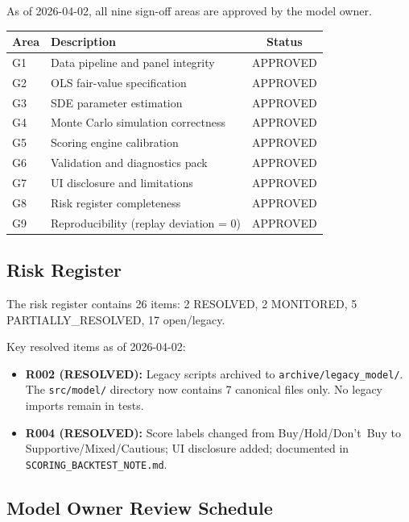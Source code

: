 \documentclass[11pt,a4paper]{article}
\theoremstyle{plain}
\theoremstyle{definition}
\begin{document}
As of 2026-04-02, all nine sign-off areas are approved by the model owner.

\begin{center}
\begin{tabular}{llc}
\toprule
Area & Description & Status \\
\midrule
G1 & Data pipeline and panel integrity      & APPROVED \\
G2 & OLS fair-value specification           & APPROVED \\
G3 & SDE parameter estimation               & APPROVED \\
G4 & Monte Carlo simulation correctness     & APPROVED \\
G5 & Scoring engine calibration             & APPROVED \\
G6 & Validation and diagnostics pack        & APPROVED \\
G7 & UI disclosure and limitations          & APPROVED \\
G8 & Risk register completeness             & APPROVED \\
G9 & Reproducibility (replay deviation = 0) & APPROVED \\
\bottomrule
\end{tabular}
\end{center}

\subsection{Risk Register}

The risk register contains 26 items:
2 RESOLVED, 2 MONITORED, 5 PARTIALLY\_RESOLVED, 17 open/legacy.

Key resolved items as of 2026-04-02:

\begin{itemize}[leftmargin=1.8em]
  \item \textbf{R002 (RESOLVED):} Legacy scripts archived to
        \texttt{archive/legacy\_model/}.  The \texttt{src/model/} directory
        now contains 7 canonical files only.  No legacy imports remain in tests.
  \item \textbf{R004 (RESOLVED):} Score labels changed from Buy/Hold/Don't~Buy
        to Supportive/Mixed/Cautious; UI disclosure added;
        documented in \texttt{SCORING\_BACKTEST\_NOTE.md}.
\end{itemize}

\subsection{Model Owner Review Schedule}
\end{document}
